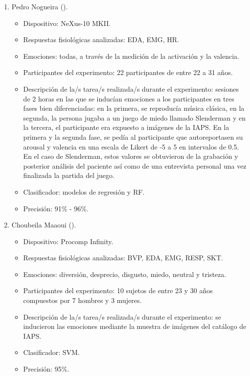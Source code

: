 \begin{enumerate}
    \item Pedro Nogueira (\citeyear{nogueira2013hybrid}).
    \begin{itemize}
        \item Dispositivo: NeXus-10 MKII.
        \item Respuestas fisiológicas analizadas: EDA, EMG, HR.
        \item Emociones: todas, a través de la medición de la activación y la valencia.
        \item Participantes del experimento: 22 participantes de entre 22 a 31 años.
        \item Descripción de la/s tarea/s realizada/s durante el experimento: sesiones de 2 horas en las que se inducían emociones a los participantes en tres fases bien diferenciadas: en la primera, se reproducía música clásica, en la segunda, la persona jugaba a un juego de miedo llamado Slenderman y en la tercera, el participante era expuesto a imágenes de la IAPS. En la primera y la segunda fase, se pedía al participante que autoreportasen su arousal y valencia en una escala de Likert de -5 a 5 en intervalos de 0.5. En el caso de Slenderman, estos valores se obtuvieron de la grabación y posterior análisis del paciente así como de una entrevista personal una vez finalizada la partida del juego.
        \item Clasificador: modelos de regresión y RF.
        \item Precisión: 91\% - 96\%.
    \end{itemize}

    \item Choubeila Maaoui (\citeyear{maaoui2010emotion}).
    \begin{itemize}
        \item Dispositivo: Procomp Infinity.
        \item Respuestas fisiológicas analizadas: BVP, EDA, EMG, RESP, SKT.
        \item Emociones: diversión, desprecio, disgusto, miedo, neutral y tristeza.
        \item Participantes del experimento: 10 sujetos de entre 23 y 30 años compuestos por 7 hombres y 3 mujeres.
        \item Descripción de la/s tarea/s realizada/s durante el experimento:  se inducieron las emociones mediante la muestra de imágenes del catálogo de IAPS.
        \item Clasificador: SVM.
        \item Precisión: 95\%.
    \end{itemize}


\end{enumerate}
